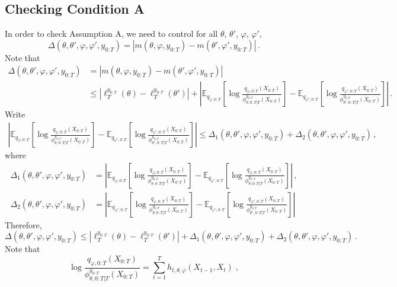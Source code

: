 \documentclass{article}
\newcommand{\1}{\mathbbm{1}}
\newcommand{\eqsp}{\;}
\begin{document}
\subsection*{Checking Condition A}
In order to check Assumption A, we need to control for all $\theta$, $\theta'$, $\varphi$, $\varphi'$,
$$
\Delta(\theta, \theta', \varphi, \varphi', y_{0:T}) = \left|m(\theta,\varphi,y_{0:T})  - m(\theta',\varphi',y_{0:T}) \right|\,.
$$
Note that
\begin{align*}
\Delta(\theta, \theta', \varphi, \varphi', y_{0:T}) &= \left|m(\theta,\varphi,y_{0:T})  - m(\theta',\varphi',y_{0:T}) \right|\\
&\leq \left|\ell_T^{y_{0:T}}(\theta) - \ell_T^{y_{0:T}}(\theta')\right| + \left|\mathbb{E}_{q_{\varphi,0:T}}\left[\log \frac{q_{\varphi,0:T}(X_{0:T})}{\phi^{y_{0:T}}_{\theta,0:T|T}(X_{0:T})}\right] - \mathbb{E}_{q_{\varphi',0:T}}\left[\log \frac{q_{\varphi',0:T}(X_{0:T})}{\phi^{y_{0:T}}_{\theta',0:T|T}(X_{0:T})}\right]\right|\,.
\end{align*}
Write
\begin{multline*}
\left|\mathbb{E}_{q_{\varphi,0:T}}\left[\log \frac{q_{\varphi,0:T}(X_{0:T})}{\phi^{y_{0:T}}_{\theta,0:T|T}(X_{0:T})}\right] - \mathbb{E}_{q_{\varphi',0:T}}\left[\log \frac{q_{\varphi',0:T}(X_{0:T})}{\phi^{y_{0:T}}_{\theta',0:T|T}(X_{0:T})}\right]\right| \leq \Delta_1(\theta, \theta', \varphi, \varphi', y_{0:T}) + \Delta_2(\theta, \theta', \varphi, \varphi', y_{0:T})\,,
\end{multline*}
where
\begin{align*}
\Delta_1(\theta, \theta', \varphi, \varphi', y_{0:T})  &= \left|\mathbb{E}_{q_{\varphi,0:T}}\left[\log \frac{q_{\varphi,0:T}(X_{0:T})}{\phi^{y_{0:T}}_{\theta,0:T|T}(X_{0:T})}\right] - \mathbb{E}_{q_{\varphi',0:T}}\left[\log \frac{q_{\varphi,0:T}(X_{0:T})}{\phi^{y_{0:T}}_{\theta,0:T|T}(X_{0:T})}\right]\right|\,,\\
\Delta_2(\theta, \theta', \varphi, \varphi', y_{0:T})&= \left|\mathbb{E}_{q_{\varphi',0:T}}\left[\log \frac{q_{\varphi,0:T}(X_{0:T})}{\phi^{y_{0:T}}_{\theta,0:T|T}(X_{0:T})}\right] - \mathbb{E}_{q_{\varphi',0:T}}\left[\log \frac{q_{\varphi',0:T}(X_{0:T})}{\phi^{y_{0:T}}_{\theta',0:T|T}(X_{0:T})}\right]\right|
\end{align*}
Therefore, 
$$
\Delta(\theta, \theta', \varphi, \varphi', y_{0:T}) \leq \left|\ell_T^{y_{0:T}}(\theta) - \ell_T^{y_{0:T}}(\theta')\right| + \Delta_1(\theta, \theta', \varphi, \varphi', y_{0:T}) + \Delta_2(\theta, \theta', \varphi, \varphi', y_{0:T}) \,.
$$
Note that
$$
\log \frac{q_{\varphi,0:T}(X_{0:T})}{\phi^{y_{0:T}}_{\theta,0:T|T}(X_{0:T})} = \sum_{t=1}^Th_{t,\theta,\varphi}(X_{t-1},X_t)\eqsp,
$$
\end{document}
